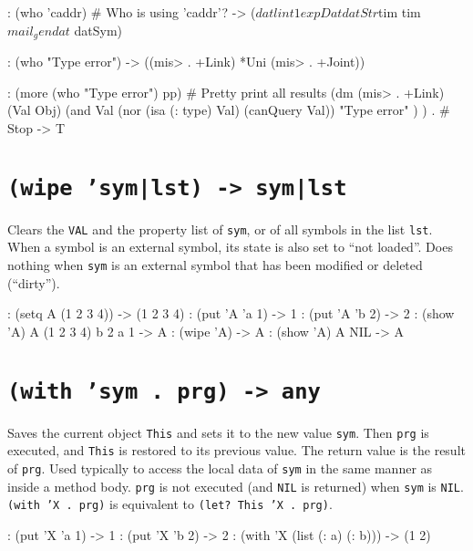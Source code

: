 \begin{wideverbatim}
: (who 'caddr)                         # Who is using 'caddr'?
-> ($dat lint1 expDat datStr $tim tim$ mail _gen dat$ datSym)

: (who "Type error")
-> ((mis> . +Link) *Uni (mis> . +Joint))

: (more (who "Type error") pp)         # Pretty print all results
(dm (mis> . +Link) (Val Obj)
   (and
      Val
      (nor (isa (: type) Val) (canQuery Val))
      "Type error" ) )
.                                      # Stop
-> T
\end{wideverbatim}

 
\section*{\texttt{(wipe 'sym|lst) -> sym|lst}}
\label{sec:func-ref-W-(wipe 'sym|lst) -> sym|lst}


Clears the \texttt{VAL} and the property list of \texttt{sym}, or of all symbols in
the list \texttt{lst}. When a symbol is an external symbol, its state is also
set to ``not loaded''. Does nothing when \texttt{sym} is an external symbol that
has been modified or deleted (``dirty'').


\begin{wideverbatim}
: (setq A (1 2 3 4))
-> (1 2 3 4)
: (put 'A 'a 1)
-> 1
: (put 'A 'b 2)
-> 2
: (show 'A)
A (1 2 3 4)
   b 2
   a 1
-> A
: (wipe 'A)
-> A
: (show 'A)
A NIL
-> A
\end{wideverbatim}

 
\section*{\texttt{(with 'sym . prg) -> any}}
\label{sec:func-ref-W-(with 'sym . prg) -> any}


Saves the current object \texttt{This} and sets it to the new value \texttt{sym}. Then
\texttt{prg} is executed, and \texttt{This} is restored to its previous value. The
return value is the result of \texttt{prg}. Used typically to access the local
data of \texttt{sym} in the same manner as inside a method body. \texttt{prg} is not
executed (and \texttt{NIL} is returned) when \texttt{sym} is \texttt{NIL}. \texttt{(with 'X . prg)}
is equivalent to \texttt{(let? This 'X . prg)}.


\begin{wideverbatim}
: (put 'X 'a 1)
-> 1
: (put 'X 'b 2)
-> 2
: (with 'X (list (: a) (: b)))
-> (1 2)
\end{wideverbatim}

